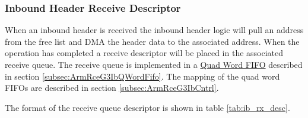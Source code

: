 \documentclass[11pt]{article}
\begin{document}
\subsubsection{Inbound Header Receive Descriptor}

When an inbound header is received the inbound header logic will pull an address from the free list and DMA the header data to the associated address. 
When the operation has completed a receive descriptor will be placed in the associated receive queue. 
The receive queue is implemented in a \hyperref[subsec:ArmRceG3IbQWordFifo]{Quad Word FIFO} described in section \ref{subsec:ArmRceG3IbQWordFifo}. 
The mapping of the quad word FIFOs are described in section \ref{subsec:ArmRceG3IbCntrl}.

The format of the receive queue descriptor is shown in table \ref{tab:ib_rx_desc}.
\end{document}
